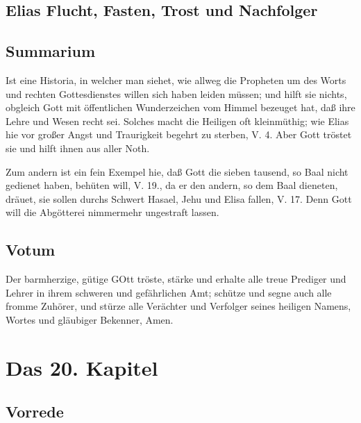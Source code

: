 \section{Elias Flucht, Fasten, Trost und Nachfolger}

\section{Summarium}

Ist eine Historia, in welcher man siehet, wie allweg die Propheten um des Worts und rechten Gottesdienstes willen sich haben leiden müssen; und hilft sie nichts, obgleich Gott mit öffentlichen Wunderzeichen vom Himmel bezeuget hat, daß ihre Lehre und Wesen recht sei. Solches macht die Heiligen oft kleinmüthig; wie Elias hie vor großer Angst und Traurigkeit begehrt zu sterben, V. 4. Aber Gott tröstet sie und hilft ihnen aus aller Noth.

Zum andern ist ein fein Exempel hie, daß Gott die sieben tausend, so Baal nicht gedienet haben, behüten will, V. 19., da er den andern, so dem Baal dieneten, dräuet, sie sollen durchs Schwert Hasael, Jehu und Elisa fallen, V. 17. Denn Gott will die Abgötterei nimmermehr ungestraft lassen.

\section{Votum}

Der barmherzige, gütige GOtt tröste, stärke und erhalte alle treue Prediger und Lehrer in ihrem schweren und gefährlichen Amt; schütze und segne auch alle fromme Zuhörer, und stürze alle Verächter und Verfolger seines heiligen Namens, Wortes und gläubiger Bekenner, Amen.

\chapter{Das 20. Kapitel}

\section{Vorrede}

